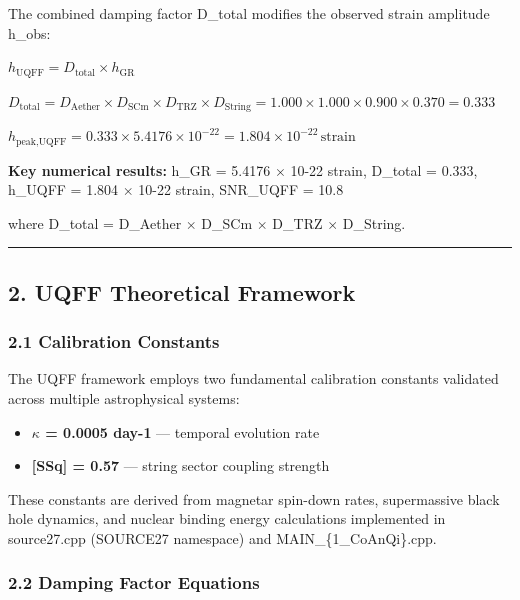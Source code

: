 \documentclass[
  11pt,
]{article}
\providecommand{\tightlist}{%
  \setlength{\itemsep}{0pt}\setlength{\parskip}{0pt}}
\begin{document}
The combined damping factor D\_total modifies the observed strain
amplitude h\_obs:

$h_{\text{UQFF}} = D_{\text{total}} \times h_{\text{GR}}$

$D_{\text{total}} = D_{\text{Aether}} \times D_{\text{SCm}} \times D_{\text{TRZ}} \times D_{\text{String}} = 1.000 \times 1.000 \times 0.900 \times 0.370 = 0.333$

$h_{\text{peak,UQFF}} = 0.333 \times 5.4176 \times 10^{-22} = 1.804 \times 10^{-22}\,\text{strain}$

\textbf{Key numerical results:} h\_GR = 5.4176 $\times$ 10-22 strain,
D\_total = 0.333, h\_UQFF = 1.804 $\times$ 10-22 strain, SNR\_UQFF =
10.8

where D\_total = D\_Aether $\times$ D\_SCm $\times$ D\_TRZ
$\times$ D\_String.

\begin{center}\rule{0.5\linewidth}{0.5pt}\end{center}

\subsection{2. UQFF Theoretical
Framework}\label{uqff-theoretical-framework}

\subsubsection{2.1 Calibration Constants}\label{calibration-constants}

The UQFF framework employs two fundamental calibration constants
validated across multiple astrophysical systems:

\begin{itemize}
\tightlist
\item
  \textbf{$\kappa$ = 0.0005 day-1} --- temporal evolution rate
\item
  \textbf{{[}SSq{]} = 0.57} --- string sector coupling strength
\end{itemize}

These constants are derived from magnetar spin-down rates, supermassive
black hole dynamics, and nuclear binding energy calculations implemented
in source27.cpp (SOURCE27 namespace) and MAIN\_\{1\_CoAnQi\}.cpp.

\subsubsection{2.2 Damping Factor
Equations}\label{damping-factor-equations}
\end{document}
